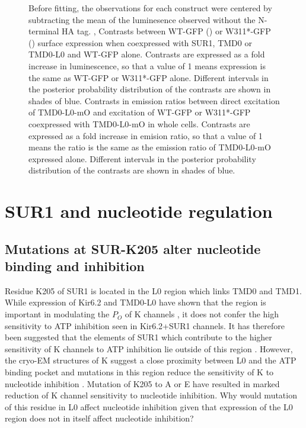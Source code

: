 \begin{figure}[h]
{	Before fitting, the observations for each construct were centered by subtracting the mean of the luminesence observed without the N-terminal HA tag.
	,  Contrasts between WT-GFP () or W311*-GFP () surface expression when coexpressed with SUR1, TMD0 or TMD0-L0 and WT-GFP alone.
	Contrasts are expressed as a fold increase in luminescence, so that a value of 1 means expression is the same as WT-GFP or W311*-GFP alone.
	Different intervals in the posterior probability distribution of the contrasts are shown in shades of blue.
	  Contrasts in emission ratios between direct excitation of TMD0-L0-mO and excitation of WT-GFP or W311*-GFP coexpressed with TMD0-L0-mO in whole cells.
	Contrasts are expressed as a fold increase in emision ratio, so that a value of 1 means the ratio is the same as the emission ratio of TMD0-L0-mO expressed alone.
	Different intervals in the posterior probability distribution of the contrasts are shown in shades of blue.
	}\label{ch6fig:tmd0_assays}
\end{figure}

\section{SUR1 and nucleotide regulation}

\subsection{Mutations at SUR-K205 alter nucleotide binding and inhibition}

Residue K205 of SUR1 is located in the L0 region which links TMD0 and TMD1.
While expression of Kir6.2 and TMD0-L0 have shown that the region is important in modulating the $P_O$ of K\ATP{} channels \cite{babenko_sur_2003, chan_n-terminal_2003-1, pratt_n-terminal_2011}, it does not confer the high sensitivity to ATP inhibition seen in Kir6.2+SUR1 channels.
It has therefore been suggested that the elements of SUR1 which contribute to the higher sensitivity of K\ATP{} channels to ATP inhibition lie outside of this region \cite{babenko_sur_2003, pratt_engineered_2012-1}.
However, the cryo-EM structures of K\ATP{} suggest a close proximity between L0 and the ATP binding pocket \cite{martin_anti-diabetic_2017-1, lee_molecular_2017-1, li_structure_2017} and mutations in this region reduce the sensitivity of K\ATP{} to nucleotide inhibition \cite{ding_structural_2019,pratt_engineered_2012-1, masia_mutation_2007}.
Mutation of K205 to A \cite{ding_structural_2019} or E \cite{ding_structural_2019} have resulted in marked reduction of K\ATP{} channel sensitivity to nucleotide inhibition.
Why would mutation of this residue in L0 affect nucleotide inhibition given that expression of the L0 region does not in itself affect nucleotide inhibition?

